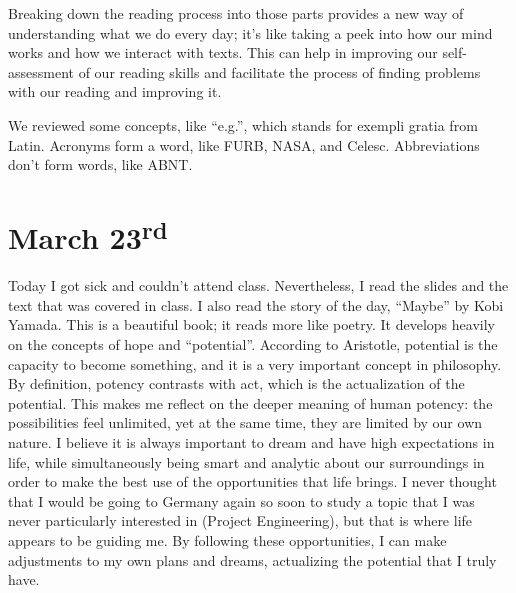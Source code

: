 Breaking down the reading process into those parts provides a new way of understanding what we do every day; it's like taking a peek into how our mind works and how we interact with texts. This can help in improving our self-assessment of our reading skills and facilitate the process of finding problems with our reading and improving it.

We reviewed some concepts, like ``e.g.'', which stands for exempli gratia from Latin. Acronyms form a word, like FURB, NASA, and Celesc. Abbreviations don't form words, like ABNT.

\section[March 23rd]{March 23\textsuperscript{rd}}
Today I got sick and couldn't attend class. Nevertheless, I read the slides and the text that was covered in class. I also read the story of the day, ``Maybe'' by Kobi Yamada. This is a beautiful book; it reads more like poetry. It develops heavily on the concepts of hope and ``potential''. According to Aristotle, potential is the capacity to become something, and it is a very important concept in philosophy. By definition, potency contrasts with act, which is the actualization of the potential. This makes me reflect on the deeper meaning of human potency: the possibilities feel unlimited, yet at the same time, they are limited by our own nature. I believe it is always important to dream and have high expectations in life, while simultaneously being smart and analytic about our surroundings in order to make the best use of the opportunities that life brings. I never thought that I would be going to Germany again so soon to study a topic that I was never particularly interested in (Project Engineering), but that is where life appears to be guiding me. By following these opportunities, I can make adjustments to my own plans and dreams, actualizing the potential that I truly have.

